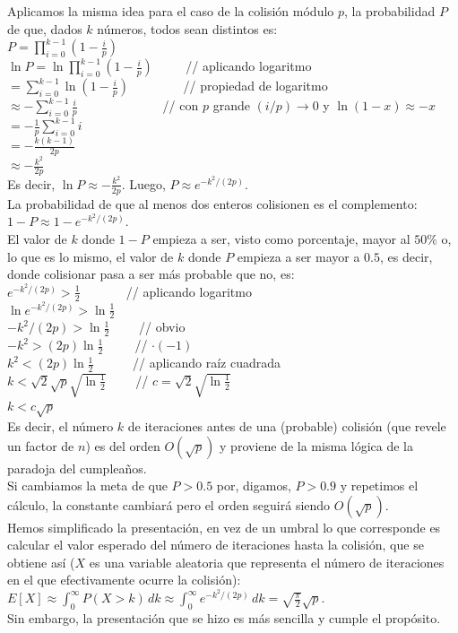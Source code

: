 Aplicamos la misma idea para el caso de la colisión módulo $p$, la probabilidad $P$ de que, dados $k$ números, todos sean distintos es: \\
$P = \prod_{i=0}^{k-1}(1-\frac{i}{p})$ \\
$\ln P = \ln \prod_{i=0}^{k-1}(1-\frac{i}{p}) \qquad \;$ // aplicando logaritmo \\
$= \sum_{i=0}^{k-1}\ln\left(1-\frac{i}{p}\right) \qquad\qquad$  // propiedad de logaritmo \\
$\approx -\sum_{i=0}^{k-1}\frac{i}{p} \qquad\qquad\qquad \,\;$  // con $p$ grande $(i/p)\rightarrow 0$ y $\ln(1-x) \approx -x$ \\
$=- \frac{1}{p} \sum_{i=0}^{k-1}i$ \\
$ = -\frac{k(k-1)}{2p}$ \\
$\approx -\frac{k^2}{2p}$ \\
Es decir, $\ln P \approx -\frac{k^2}{2p}$. Luego, $P \approx e^{-k^2/(2p)}$. \\
La probabilidad de que al menos dos enteros colisionen es el complemento: \\
$1 - P \approx 1 - e^{-k^2/(2p)}$. \\
El valor de $k$ donde $1-P$ empieza a ser, visto como porcentaje, mayor al $50\%$ o, lo que es lo mismo, el valor de $k$ donde $P$ empieza a ser mayor a $0.5$, es decir, donde colisionar pasa a ser más probable que no, es: \\
$e^{-k^2/(2p)} > \frac{1}{2} \qquad \quad \, \,$ // aplicando logaritmo \\
$\ln e^{-k^2/(2p)} > \ln \frac{1}{2} \qquad$ \\
${-k^2/(2p)} > \ln \frac{1}{2} \qquad$ // obvio \\
$-k^2 > (2p) \ln \frac{1}{2} \qquad \,$ // $\cdot(-1)$  \\
$k^2 < (2p) \ln \frac{1}{2} \qquad \, \, \, \;$ // aplicando raíz cuadrada \\
$k < \sqrt 2 \sqrt p \sqrt{\ln \frac{1}{2}}\qquad$ // $c=\sqrt 2 \sqrt{\ln \frac{1}{2}}$ \\
$k < c \sqrt p$ \\
Es decir, el número $k$ de iteraciones antes de una (probable) colisión (que revele un factor de $n$) es del orden $O(\sqrt{p})$ y proviene de la misma lógica de la paradoja del cumpleaños. \\
Si cambiamos la meta de que $P>0.5$ por, digamos, $P>0.9$ y repetimos el cálculo, la constante cambiará pero el orden seguirá siendo $O(\sqrt{p})$. \\
Hemos simplificado la presentación, en vez de un umbral lo que corresponde es calcular el valor esperado del número de iteraciones hasta la colisión, que se obtiene así ($X$ es una variable aleatoria que representa el número de iteraciones en el que efectivamente ocurre la colisión): \\
$E[X] \approx \int_0^\infty P(X>k)\,dk \approx \int_0^\infty e^{-k^2/(2p)}\,dk = \sqrt{\frac{\pi}{2}} \sqrt{p}$. \\
Sin embargo, la presentación que se hizo es más sencilla y cumple el propósito. \\

